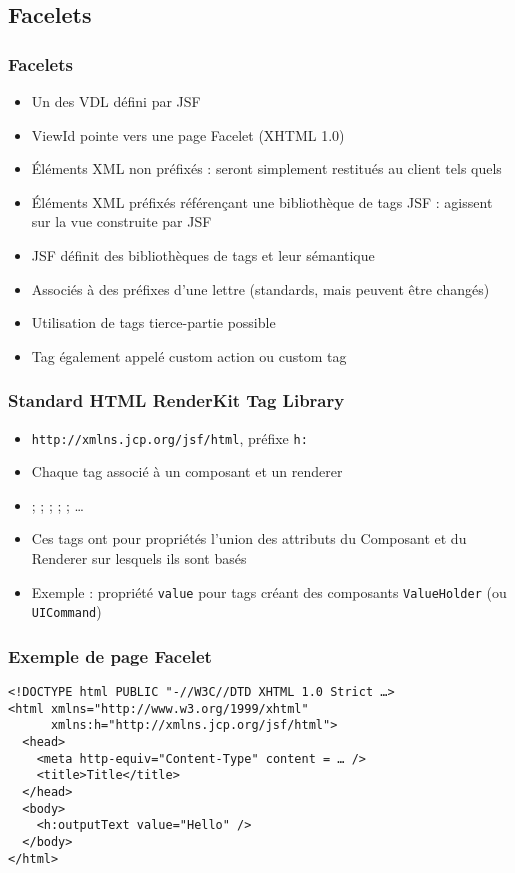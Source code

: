 \documentclass[english, french]{beamer}
\begin{document}
\subsection{Facelets}
\begin{frame}
	\frametitle{Facelets}
	\begin{itemize}
		\item Un des VDL défini par JSF
		\item ViewId pointe vers une page Facelet (XHTML 1.0)
		\item Éléments XML non préfixés : seront simplement restitués au client tels quels
		\item Éléments XML préfixés référençant une bibliothèque de tags JSF : agissent sur la vue construite par JSF
		\item JSF définit des bibliothèques de tags et leur sémantique
		\item Associés à des préfixes d’une lettre {\tiny (standards, mais peuvent être changés)}
		\item Utilisation de tags tierce-partie possible
		\item \tiny Tag également appelé custom action ou custom tag
	\end{itemize}
\end{frame}

\begin{frame}
	\frametitle{Standard HTML RenderKit Tag Library}
	\begin{itemize}
		\item \texttt{http://xmlns.jcp.org/jsf/html}, préfixe \texttt{h:}
		\item Chaque tag associé à un composant et un renderer  %
		\item {} ;  ;  ;  ;  ; …
		\item Ces tags ont pour propriétés l’union des attributs du Composant et du Renderer sur lesquels ils sont basés
		\item Exemple : propriété \texttt{value} pour tags créant des composants \texttt{ValueHolder} (ou \texttt{UICommand})
	\end{itemize}
\end{frame}

\begin{frame}[fragile]
	\frametitle{Exemple de page Facelet}
	\begin{lstlisting}
<!DOCTYPE html PUBLIC "-//W3C//DTD XHTML 1.0 Strict …>
<html xmlns="http://www.w3.org/1999/xhtml"
      xmlns:h="http://xmlns.jcp.org/jsf/html">
  <head>
    <meta http-equiv="Content-Type" content = … />
    <title>Title</title>
  </head>
  <body>
    <h:outputText value="Hello" />
  </body>
</html>
	\end{lstlisting}
\end{frame}
	
\end{document}
